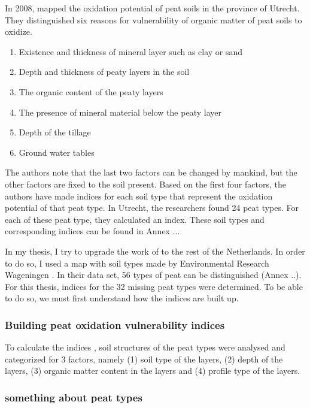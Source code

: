 \documentclass[12pt,a4paper,titlepage]{article}
\begin{document}
In 2008, \citet{stouthamer2008toelichting} mapped the oxidation potential of peat soils in the province of Utrecht. They distinguished six reasons for vulnerability of organic matter of peat soils to oxidize. 

\begin{enumerate}
\item{Existence and thickness of mineral layer such as clay or sand}
\item{Depth and thickness of peaty layers in the soil}
\item{The organic content of the peaty layers}
\item{The presence of mineral material below the peaty layer}
\item{Depth of the tillage}
\item{Ground water tables}
\end{enumerate}

The authors note that the last two factors can be changed by mankind, but the other factors are fixed to the soil present. Based on the first four factors, the authors have made indices for each soil type that represent the oxidation potential of that peat type. In Utrecht, the researchers found 24 peat types. For each of these peat type, they calculated an index. These soil types and corresponding indices can be found in Annex ...

In my thesis, I try to upgrade the work of \citet{stouthamer2008toelichting} to the rest of the Netherlands. In order to do so, I used a map with soil types made by Environmental Research Wageningen \citep{}. In their data set, 56 types of peat can be distinguished (Annex ..). For this thesis, indices for the 32 missing peat types were determined. To be able to do so, we must first understand how the indices are built up.

\subsubsection{Building peat oxidation vulnerability indices}

To calculate the indices \citet{stouthamer2008toelichting}, soil structures of the peat types were analysed and categorized for 3 factors, namely (1) soil type of the layers, (2) depth of the layers, (3) organic matter content in the layers and (4) profile type of the layers.

\subsubsection{something about peat types}
\end{document}
